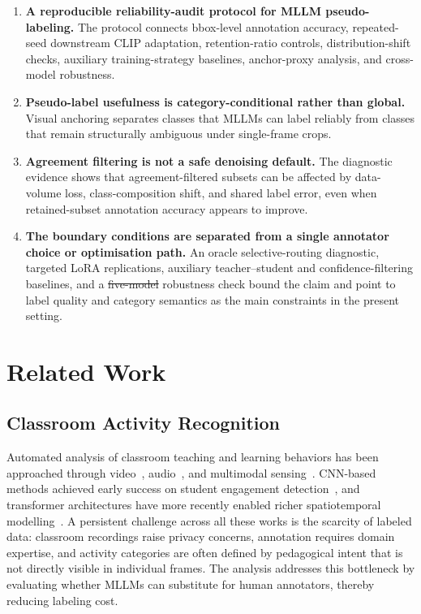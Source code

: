 \documentclass{ieeeaccess}
\providecommand{\DIFadd}[1]{{\protect\color{blue}\uwave{#1}}} %
\providecommand{\DIFdel}[1]{{\protect\color{red}\sout{#1}}}                      %
\providecommand{\DIFaddbegin}{} %
\providecommand{\DIFaddend}{} %
\providecommand{\DIFdelbegin}{} %
\providecommand{\DIFdelend}{} %
\newcommand{\DIFscaledelfig}{0.5}
\newlength{\DIFdelgraphicswidth} %
\newlength{\DIFdelgraphicsheight} %
\newcommand{\DIFaddincludegraphics}[2][]{{\color{blue}\fbox{\DIFOincludegraphics[#1]{#2}}}} %
\newcommand{\DIFdelincludegraphics}[2][]{%
\sbox{\DIFdelgraphicsbox}{\DIFOincludegraphics[#1]{#2}}%
\settoboxwidth{\DIFdelgraphicswidth}{\DIFdelgraphicsbox} %
\settoboxtotalheight{\DIFdelgraphicsheight}{\DIFdelgraphicsbox} %
\scalebox{\DIFscaledelfig}{%
\parbox[b]{\DIFdelgraphicswidth}{\usebox{\DIFdelgraphicsbox}\\[-\baselineskip] \rule{\DIFdelgraphicswidth}{0em}}\llap{\resizebox{\DIFdelgraphicswidth}{\DIFdelgraphicsheight}{%
\setlength{\unitlength}{\DIFdelgraphicswidth}%
\begin{picture}(1,1)%
\thicklines\linethickness{2pt} %
{\color[rgb]{1,0,0}\put(0,0){\framebox(1,1){}}}%
{\color[rgb]{1,0,0}\put(0,0){\line( 1,1){1}}}%
{\color[rgb]{1,0,0}\put(0,1){\line(1,-1){1}}}%
\end{picture}%
}\hspace*{3pt}}} %
} %
\DeclareRobustCommand{\DIFaddbegin}{\DIFOaddbegin \let\includegraphics\DIFaddincludegraphics} %
\DeclareRobustCommand{\DIFaddend}{\DIFOaddend \let\includegraphics\DIFOincludegraphics} %
\DeclareRobustCommand{\DIFdelbegin}{\DIFOdelbegin \let\includegraphics\DIFdelincludegraphics} %
\DeclareRobustCommand{\DIFdelend}{\DIFOaddend \let\includegraphics\DIFOincludegraphics} %
\begin{document}
\begin{enumerate}

  \item \textbf{A reproducible reliability-audit protocol for MLLM
  pseudo-labeling.}
  The protocol connects bbox-level annotation accuracy, repeated-seed
  downstream CLIP adaptation, retention-ratio controls,
  distribution-shift checks, auxiliary training-strategy baselines,
  anchor-proxy analysis, and cross-model robustness.

  \item \textbf{Pseudo-label usefulness is category-conditional rather
  than global.}
  Visual anchoring separates classes that MLLMs can label reliably
  from classes that remain structurally ambiguous under single-frame
  crops.

  \item \textbf{Agreement filtering is not a safe denoising default.}
  The diagnostic evidence shows that agreement-filtered subsets can be
  affected by data-volume loss, class-composition shift, and shared
  label error, even when retained-subset annotation accuracy appears to
  improve.

  \item \textbf{The boundary conditions are separated from a single
  annotator choice or optimisation path.}
  An oracle selective-routing diagnostic, targeted LoRA replications,
  auxiliary teacher--student and confidence-filtering baselines, and a
  \DIFdelbegin \DIFdel{five-model }\DIFdelend \DIFaddbegin \DIFadd{ten-model }\DIFaddend robustness check bound the claim and point to label quality
  and category semantics as the main constraints in the present setting.

\end{enumerate}


\section{Related Work}
\label{sec:related}

\subsection{Classroom Activity Recognition}

Automated analysis of classroom teaching and learning behaviors has
been approached through video~\cite{whitehill2014automated},
audio~\cite{donnelly2017automatic}, and multimodal
sensing~\cite{dillenbourg2011classroom}.
CNN-based methods achieved early success on student engagement
detection~\cite{zhang2020classroom_cnn}, and transformer architectures
have more recently enabled richer spatiotemporal
modelling~\cite{li2022classroom_transformer}.
A persistent challenge across all these works is the scarcity of
labeled data: classroom recordings raise privacy concerns, annotation
requires domain expertise, and activity categories are often defined
by pedagogical intent that is not directly visible in individual
frames.
The analysis addresses this bottleneck by evaluating whether
MLLMs can substitute for human annotators, thereby reducing labeling
cost.
\end{document}
